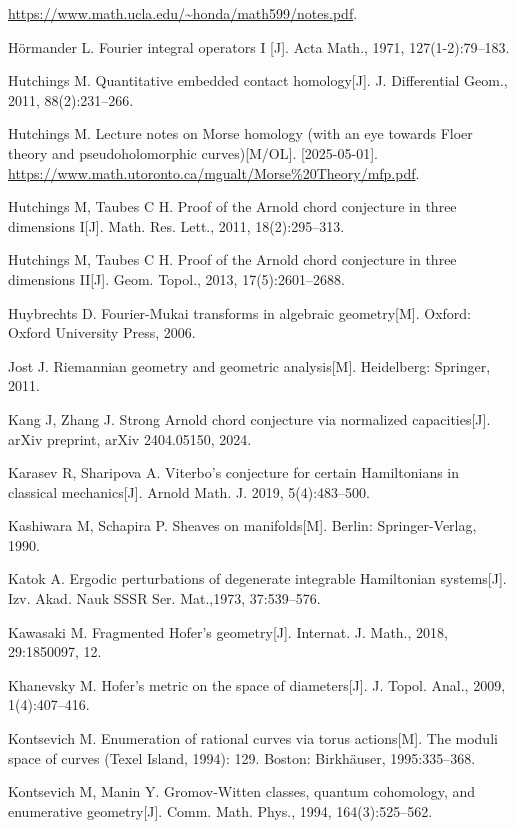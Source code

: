 \begin{enumerate}[label={[\arabic*]},leftmargin=3.2em,itemsep=2pt,parsep=0pt]
        \url{https://www.math.ucla.edu/~honda/math599/notes.pdf}.
  \item Hörmander L. Fourier integral operators I [J]. Acta Math., 1971, 127(1-2):79--183.
  \item Hutchings M. Quantitative embedded contact homology[J]. J. Differential Geom.,
        2011, 88(2):231--266.
  \item Hutchings M. Lecture notes on Morse homology (with an eye towards Floer theory and
        pseudoholomorphic curves)[M/OL]. [2025-05-01].
        \url{https://www.math.utoronto.ca/mgualt/Morse%20Theory/mfp.pdf}.
  \item Hutchings M, Taubes C H. Proof of the Arnold chord conjecture in three dimensions
        I[J]. Math. Res. Lett., 2011, 18(2):295--313.
  \item Hutchings M, Taubes C H. Proof of the Arnold chord conjecture in three dimensions
        II[J]. Geom. Topol., 2013, 17(5):2601--2688.
  \item Huybrechts D. Fourier-Mukai transforms in algebraic geometry[M]. Oxford: Oxford
        University Press, 2006.
  \item Jost J. Riemannian geometry and geometric analysis[M]. Heidelberg: Springer, 2011.
  \item Kang J, Zhang J. Strong Arnold chord conjecture via normalized capacities[J].
        arXiv preprint, arXiv 2404.05150, 2024.
  \item Karasev R, Sharipova A. Viterbo's conjecture for certain Hamiltonians in classical
        mechanics[J]. Arnold Math. J. 2019, 5(4):483--500.
  \item Kashiwara M, Schapira P. Sheaves on manifolds[M]. Berlin: Springer-Verlag, 1990.
  \item Katok A. Ergodic perturbations of degenerate integrable Hamiltonian systems[J].
        Izv. Akad. Nauk SSSR Ser. Mat.,1973, 37:539--576.
  \item Kawasaki M. Fragmented Hofer's geometry[J]. Internat. J. Math., 2018, 29:1850097,
        12.
  \item Khanevsky M. Hofer's metric on the space of diameters[J]. J. Topol. Anal., 2009,
        1(4):407--416.
  \item Kontsevich M. Enumeration of rational curves via torus actions[M]. The moduli space
        of curves (Texel Island, 1994): 129. Boston: Birkhäuser, 1995:335--368.
  \item Kontsevich M, Manin Y. Gromov-Witten classes, quantum cohomology, and enumerative
        geometry[J]. Comm. Math. Phys., 1994, 164(3):525--562.

\end{enumerate}
